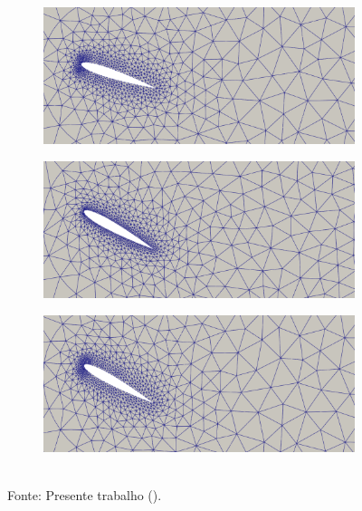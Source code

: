 \begin{figure}[h!]
\begin{subfigure}{.49\linewidth}
    \end{subfigure}
    \begin{subfigure}{.49\linewidth}
        \centering
        \includegraphics[width=\linewidth]{Figuras/rotating-airfoil/m22.png}
    \end{subfigure}
    \caption*{Instante $t=8,2$.}
    \begin{subfigure}{.49\linewidth}
        \centering
        \includegraphics[width=\linewidth]{Figuras/rotating-airfoil/m13.png}
    \end{subfigure}
    \begin{subfigure}{.49\linewidth}
        \centering
        \includegraphics[width=\linewidth]{Figuras/rotating-airfoil/m23.png}
    \end{subfigure}
    \\Fonte: Presente trabalho (\the\year).
    \label{fig:mesh}
\end{figure}